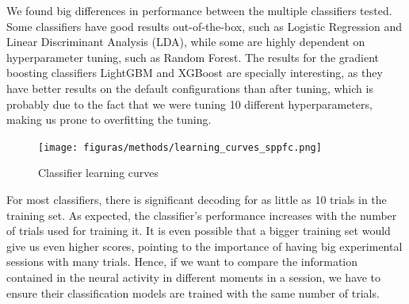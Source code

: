 We found big differences in performance between the multiple classifiers tested. Some classifiers have good results out-of-the-box, such as Logistic Regression and Linear Discriminant Analysis (LDA), while some are highly dependent on hyperparameter tuning, such as Random Forest. The results for the gradient boosting classifiers LightGBM and XGBoost are specially interesting, as they have better results on the default configurations than after tuning, which is probably due to the fact that we were tuning 10 different hyperparameters, making us prone to overfitting the tuning.

\begin{figure}
    \centering
    \texttt{[image: figuras/methods/learning\_curves\_sppfc.png]}
    \caption{Classifier learning curves}
    \label{fig:clf_curves}
\end{figure}
For most classifiers, there is significant decoding for as little as 10 trials in the training set. As expected, the classifier's performance increases with the number of trials used for training it. It is even possible that a bigger training set would give us even higher scores, pointing to the importance of having big experimental sessions with many trials. Hence, if we want to compare the information contained in the neural activity in different moments in a session, we have to ensure their classification models are trained with the same number of trials.


